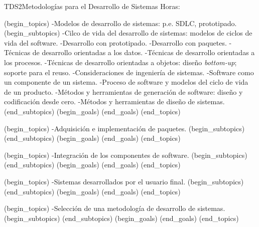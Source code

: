 \begin{BKL2}{TDS2}{Metodologías para el Desarrollo de Sistemas}
Horas:
 
(begin_topics)
-Modelos de desarrollo de sistemas: p.e. SDLC, prototipado.
(begin_subtopics)
-Cilco de vida del desarrollo de sistemas: modelos de ciclos de vida del software.
-Desarrollo con prototipado.
-Desarrollo con paquetes.
-Técnicas de desarrollo orientadas a los datos.
-Técnicas de desarrollo orientadas a los procesos.
-Técnicas de desarrollo orientadas a objetos: diseño {\it bottom-up}; soporte para el reuso.
-Consideraciones de ingeniería de sistemas.
-Software como un componente de un sistema.
-Proceso de software y modelos del ciclo de vida de un producto.
-Métodos y herramientas de generación de software: diseño y codificación desde cero.
-Métodos y herramientas de diseño de sistemas.
(end_subtopics)
(begin_goals)
(end_goals)
(end_topics)

 
(begin_topics)
-Adquisición e implementación de paquetes.
(begin_subtopics)
(end_subtopics)
(begin_goals)
(end_goals)
(end_topics)

 
(begin_topics)
-Integración de los componentes de software.
(begin_subtopics)
(end_subtopics)
(begin_goals)
(end_goals)
(end_topics)

 
(begin_topics)
-Sistemas desarrollados por el usuario final.
(begin_subtopics)
(end_subtopics)
(begin_goals)
(end_goals)
(end_topics)

 
(begin_topics)
-Selección de una metodología de desarrollo de sistemas.
(begin_subtopics)
(end_subtopics)
(begin_goals)
(end_goals)
(end_topics)

\end{BKL2}



